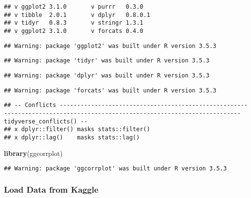 \documentclass[]{article}
\newenvironment{Shaded}{\begin{snugshade}}{\end{snugshade}}
\newcommand{\KeywordTok}[1]{\textcolor[rgb]{0.13,0.29,0.53}{\textbf{#1}}}
\newcommand{\NormalTok}[1]{#1}
\begin{document}
\begin{verbatim}
## v ggplot2 3.1.0       v purrr   0.3.0  
## v tibble  2.0.1       v dplyr   0.8.0.1
## v tidyr   0.8.3       v stringr 1.3.1  
## v ggplot2 3.1.0       v forcats 0.4.0
\end{verbatim}

\begin{verbatim}
## Warning: package 'ggplot2' was built under R version 3.5.3
\end{verbatim}

\begin{verbatim}
## Warning: package 'tidyr' was built under R version 3.5.3
\end{verbatim}

\begin{verbatim}
## Warning: package 'dplyr' was built under R version 3.5.3
\end{verbatim}

\begin{verbatim}
## Warning: package 'forcats' was built under R version 3.5.3
\end{verbatim}

\begin{verbatim}
## -- Conflicts -------------------------------------------------------------------------------------------------------------------------- tidyverse_conflicts() --
## x dplyr::filter() masks stats::filter()
## x dplyr::lag()    masks stats::lag()
\end{verbatim}

\begin{Shaded}
\begin{Highlighting}[]
\KeywordTok{library}\NormalTok{(ggcorrplot)}
\end{Highlighting}
\end{Shaded}

\begin{verbatim}
## Warning: package 'ggcorrplot' was built under R version 3.5.3
\end{verbatim}

\subsubsection{Load Data from Kaggle}\label{load-data-from-kaggle}
\end{document}
